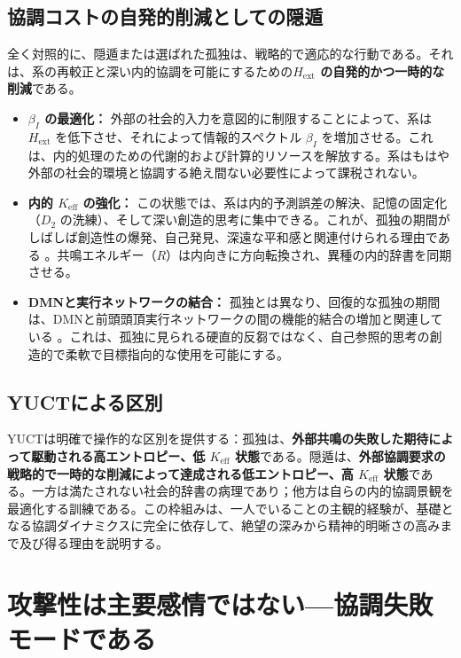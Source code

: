 \documentclass[12pt,a4paper]{article}
\begin{document}
	\subsection{協調コストの自発的削減としての隠遁}
	
	全く対照的に、隠遁または選ばれた孤独は、戦略的で適応的な行動である。それは、系の再較正と深い内的協調を可能にするための\textbf{\(H_{\mathrm{ext}}\) の自発的かつ一時的な削減}である。
	
	\begin{itemize}
		\item \textbf{\(\beta_I\) の最適化：} 外部の社会的入力を意図的に制限することによって、系は \(H_{\mathrm{ext}}\) を低下させ、それによって情報的スペクトル \(\beta_I\) を増加させる。これは、内的処理のための代謝的および計算的リソースを解放する。系はもはや外部の社会的環境と協調する絶え間ない必要性によって課税されない。
		\item \textbf{内的 \(K_{\mathrm{eff}}\) の強化：} この状態では、系は内的予測誤差の解決、記憶の固定化（\(D_2\) の洗練）、そして深い創造的思考に集中できる。これが、孤独の期間がしばしば創造性の爆発、自己発見、深遠な平和感と関連付けられる理由である \cite{Nguyen2023}。共鳴エネルギー（\(R\)）は内向きに方向転換され、異種の内的辞書を同期させる。
		\item \textbf{DMNと実行ネットワークの結合：} 孤独とは異なり、回復的な孤独の期間は、DMNと前頭頭頂実行ネットワークの間の機能的結合の増加と関連している \cite{Llera2024}。これは、孤独に見られる硬直的反芻ではなく、自己参照的思考の創造的で柔軟で目標指向的な使用を可能にする。
	\end{itemize}
	
	\subsection{YUCTによる区別}
	
	YUCTは明確で操作的な区別を提供する：孤独は、\textbf{外部共鳴の失敗した期待によって駆動される高エントロピー、低 \(K_{\mathrm{eff}}\) 状態}である。隠遁は、\textbf{外部協調要求の戦略的で一時的な削減によって達成される低エントロピー、高 \(K_{\mathrm{eff}}\) 状態}である。一方は満たされない社会的辞書の病理であり；他方は自らの内的協調景観を最適化する訓練である。この枠組みは、一人でいることの主観的経験が、基礎となる協調ダイナミクスに完全に依存して、絶望の深みから精神的明晰さの高みまで及び得る理由を説明する。
	
	\section{攻撃性は主要感情ではない—協調失敗モードである}
	
\end{document}
